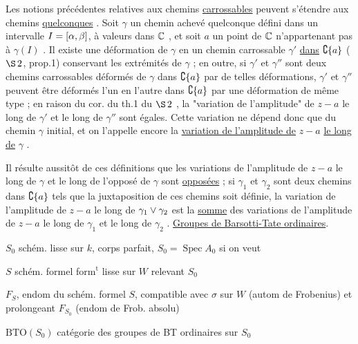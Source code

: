 Les notions précédentes relatives aux chemins \uline{carrossables} peuvent s'étendre aux chemins \uline{quelconques} . Soit $\gamma$ un chemin achevé quelconque défini dans un intervalle $I=[\alpha,\beta]$, à valeurs dans $\mathbb C$ , et soit $a$ un point de $\mathbb C$ n'appartenant pas à $\gamma(I)$ . Il existe une déformation de $\gamma$ en un chemin carrossable $\gamma'$ \uline{dans} $\complement\{a\}$ ($\S\,2$, prop.1) conservant les extrémités de $\gamma$ ; en outre, si $\gamma'$ et $\gamma''$ sont deux chemins carrossables déformés de $\gamma$ dans $\complement\{a\}$ par de telles déformations, $\gamma'$ et $\gamma''$ peuvent être déformés l'un en l'autre dans $\complement\{a\}$ par une déformation de même type ; en raison du cor. du th.1 du $\S\,2$ , la "variation de l'amplitude" de $z-a$ le long de $\gamma'$ et le long de $\gamma''$ sont égales. Cette variation ne dépend donc que du chemin $\gamma$ initial, et on l'appelle encore la \uline{variation de l'amplitude de} $z-a$ \uline{le long de} $\gamma$ .
\margin{\handwritten{$\bigl(\ \big|$}}

Il résulte aussitôt de ces définitions que les variations de l'amplitude de $z-a$ le long de $\gamma$ et le long de l'opposé de $\gamma$ sont \uline{opposées} ; si $\gamma_1$ et $\gamma_2$ sont deux chemins dans $\complement\{a\}$ tels que la juxtaposition de ces chemins soit définie, la variation de l'amplitude de $z-a$ le long de $\gamma_1\vee\gamma_2$ est la \uline{somme} des variations de l'amplitude de $z-a$ le long de $\gamma_1$ et le long de $\gamma_2$ .
\uline{Groupes de Barsotti-Tate ordinaires}.

$S_0$ schém. lisse sur $k$, corps parfait, $S_0=\operatorname{Spec} A_0$ si on veut

$S$ schém. formel form$^{\mathrm t}$ lisse sur $W$ relevant $S_0$

$F_S$, endom  du schém. formel $S$, compatible avec $\sigma$ sur $W$ (autom de Frobenius) et prolongeant $F_{S_0}$ (endom de Frob. absolu)

$\mathrm{BTO}(S_0)$ catégorie des groupes de BT ordinaires sur $S_0$

